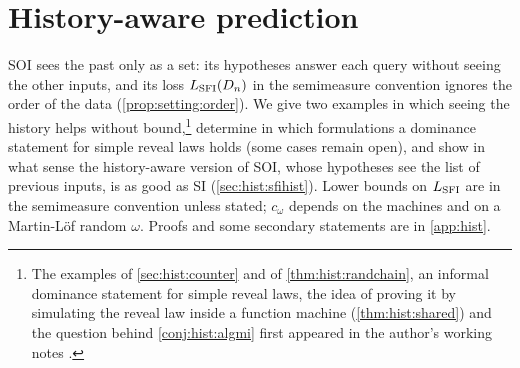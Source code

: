 \section{History-aware prediction}\label{sec:hist}

SOI sees the past only as a set: its hypotheses answer each query without seeing the other inputs, and its loss $L_{\mathrm{SFI}}(D_n)$ in the semimeasure convention ignores the order of the data (\cref{prop:setting:order}). We give two examples in which seeing the history helps without bound,\footnote{The examples of \cref{sec:hist:counter} and of \cref{thm:hist:randchain}, an informal dominance statement for simple reveal laws, the idea of proving it by simulating the reveal law inside a function machine (\cref{thm:hist:shared}) and the question behind \cref{conj:hist:algmi} first appeared in the author's working notes \citep{hanni2026notes}.} determine in which formulations a dominance statement for simple reveal laws holds (some cases remain open), and show in what sense the history-aware version of SOI, whose hypotheses see the list of previous inputs, is as good as SI (\cref{sec:hist:sfihist}). Lower bounds on $L_{\mathrm{SFI}}$ are in the semimeasure convention unless stated; $c_\omega$ depends on the machines and on a Martin-L\"of random $\omega$. Proofs and some secondary statements are in \cref{app:hist}.

